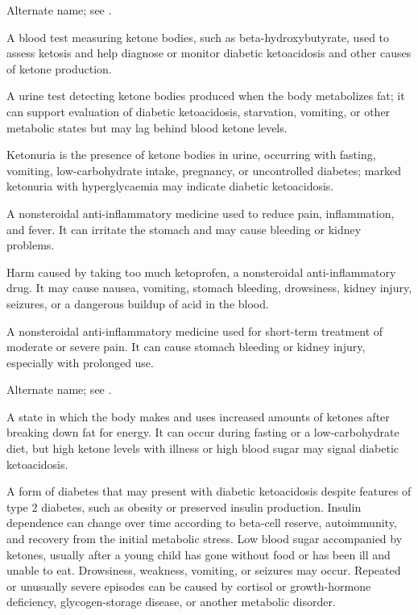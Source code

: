  Alternate name; see .

 A blood test measuring ketone bodies, such as beta-hydroxybutyrate, used to assess ketosis and help diagnose or monitor diabetic ketoacidosis and other causes of ketone production.

 A urine test detecting ketone bodies produced when the body metabolizes fat; it can support evaluation of diabetic ketoacidosis, starvation, vomiting, or other metabolic states but may lag behind blood ketone levels.

 Ketonuria is the presence of ketone bodies in urine, occurring with fasting, vomiting, low-carbohydrate intake, pregnancy, or uncontrolled diabetes; marked ketonuria with hyperglycaemia may indicate diabetic ketoacidosis.

 A nonsteroidal anti-inflammatory medicine used to reduce pain, inflammation, and fever. It can irritate the stomach and may cause bleeding or kidney problems.

 Harm caused by taking too much ketoprofen, a nonsteroidal anti-inflammatory drug. It may cause nausea, vomiting, stomach bleeding, drowsiness, kidney injury, seizures, or a dangerous buildup of acid in the blood.

 A nonsteroidal anti-inflammatory medicine used for short-term treatment of moderate or severe pain. It can cause stomach bleeding or kidney injury, especially with prolonged use.

 Alternate name; see .

 A state in which the body makes and uses increased amounts of ketones after breaking down fat for energy. It can occur during fasting or a low-carbohydrate diet, but high ketone levels with illness or high blood sugar may signal diabetic ketoacidosis.

 A form of diabetes that may present with diabetic ketoacidosis despite features of type 2 diabetes, such as obesity or preserved insulin production. Insulin dependence can change over time according to beta-cell reserve, autoimmunity, and recovery from the initial metabolic stress.
 Low blood sugar accompanied by ketones, usually after a young child has gone without food or has been ill and unable to eat. Drowsiness, weakness, vomiting, or seizures may occur. Repeated or unusually severe episodes can be caused by cortisol or growth-hormone deficiency, glycogen-storage disease, or another metabolic disorder.

